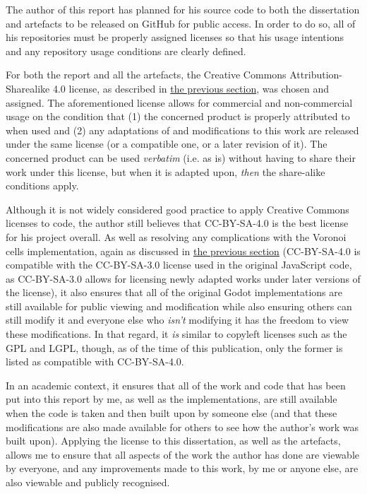The author of this report has planned for his source code to both the dissertation and artefacts to be released on GitHub for public access. In order to do so, all of his repositories must be properly assigned licenses so that his usage intentions and any repository usage conditions are clearly defined. 

For both the report and all the artefacts, the Creative Commons Attribution-Sharealike 4.0 license, as described in \hyperref[howuse]{the previous section}, was chosen and assigned. The aforementioned license allows for commercial and non-commercial usage on the condition that (1) the concerned product is properly attributed to when used and (2) any adaptations of and modifications to this work are released under the same license (or a compatible one, or a later revision of it).\cite{cc_at_sa_4} The concerned product can be used \textit{verbatim} (i.e. as is) without having to share their work under this license, but when it is adapted upon, \textit{then} the share-alike conditions apply.

Although it is not widely considered good practice to apply Creative Commons licenses to code\cite{cc_faq_code}, the author still believes that CC-BY-SA-4.0 is the best license for his project overall. As well as resolving any complications with the Voronoi cells implementation, again as discussed in \hyperref[howuse]{the previous section} (CC-BY-SA-4.0 is compatible with the CC-BY-SA-3.0 license used in the original JavaScript code, as CC-BY-SA-3.0 allows for licensing newly adapted works under later versions of the license\cite{cc_compat}), it also ensures that all of the original Godot implementations are still available for public viewing and modification while also ensuring others can still modify it and everyone else who \textit{isn't} modifying it has the freedom to view these modifications. In that regard, it \textit{is} similar to copyleft licenses such as the GPL and LGPL, though, as of the time of this publication, only the former is listed as compatible with CC-BY-SA-4.0.\cite{cc_compat}

In an academic context, it ensures that all of the work and code that has been put into this report by me, as well as the implementations, are still available when the code is taken and then built upon by someone else (and that these modifications are also made available for others to see how the author's work was built upon). Applying the license to this dissertation, as well as the artefacts, allows me to ensure that all aspects of the work the author has done are viewable by everyone, and any improvements made to this work, by me or anyone else, are also viewable and publicly recognised.

